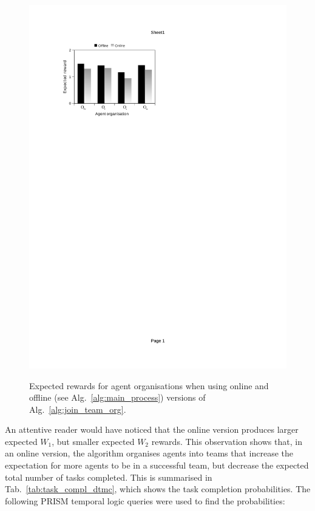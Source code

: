 \documentclass{llncs}
\begin{document}
\begin{figure}[t]
{{  \includegraphics[clip=true, trim=70 579 300 90, scale=0.77]{images/w2_dtmc}
}}
\caption{Expected rewards for agent organisations when using online and offline (see Alg.~\ref{alg:main_process}) versions of Alg.~\ref{alg:join_team_org}.}
\label{fig:bar_chart_dtmc}
\end{figure}
An attentive reader would have noticed that the online version produces larger expected $W_1$, but smaller expected $W_2$ rewards. This observation shows that, in an online version, the algorithm organises agents into teams that increase the expectation for more agents to be in a successful team, but decrease the expected total number of tasks completed. This is summarised in Tab.~\ref{tab:task_compl_dtmc}, which shows the task completion probabilities. The following PRISM temporal logic queries were used to find the probabilities:
\end{document}
